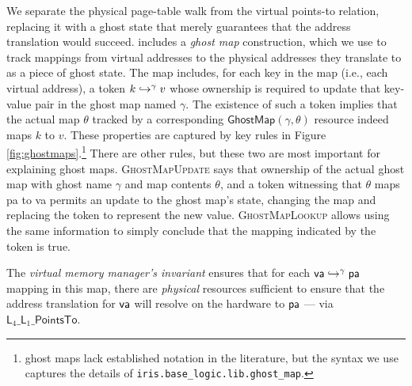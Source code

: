   We separate the physical page-table walk from the virtual points-to relation, replacing it with a ghost state that merely guarantees that the address translation would succeed.
  \iris includes a \emph{ghost map} construction, which we use to track mappings from virtual addresses to the physical addresses they translate to as a piece of ghost state.
  The map includes, for each key in the map (i.e.,
  each virtual address), a token $k\hookrightarrow^{\gamma}v$ whose ownership is required to update that key-value pair in the ghost map named $\gamma$. The existence of such a token implies that the actual map $\theta$ tracked by a corresponding $\mathsf{GhostMap}(\gamma,\theta)$
  resource indeed maps $k$ to $v$. These properties are captured by key \iris rules in Figure \ref{fig:ghostmaps}.\footnote{\iris ghost maps lack established notation in the literature,
  but the syntax we use captures the details of \texttt{iris.base\_logic.lib.ghost\_map}.}
  There are other rules, but these two are most important for explaining ghost maps.
  \textsc{GhostMapUpdate} says that ownership of the actual ghost map with ghost name $\gamma$ and map contents $\theta$,
  and a token witnessing that $\theta$ maps \textsf{pa} to \textsf{va} permits an update to the ghost map's state,
  changing the map and replacing the token to represent the new value.
  \textsc{GhostMapLookup} allows using the same information to simply conclude that the mapping indicated by the token is true.
  
  The \emph{virtual memory manager's invariant} ensures that for each $\mathsf{va}\hookrightarrow^{\gamma}\textsf{pa}$ mapping in this map, there are \emph{physical} resources sufficient to ensure that the address translation for $\mathsf{va}$
will resolve on the hardware to $\textsf{pa}$ --- via $\textsf{L}_{4}\_\textsf{L}_{1}\_\textsf{PointsTo}$.


